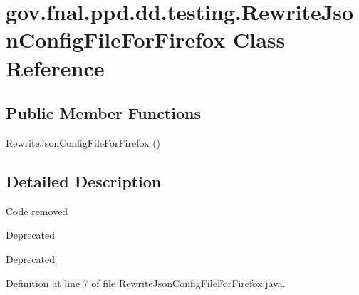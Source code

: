 \hypertarget{classgov_1_1fnal_1_1ppd_1_1dd_1_1testing_1_1RewriteJsonConfigFileForFirefox}{\section{gov.\-fnal.\-ppd.\-dd.\-testing.\-Rewrite\-Json\-Config\-File\-For\-Firefox Class Reference}
\label{classgov_1_1fnal_1_1ppd_1_1dd_1_1testing_1_1RewriteJsonConfigFileForFirefox}
}
\subsection*{Public Member Functions}
\begin{DoxyCompactItemize}
\item 
\hyperlink{classgov_1_1fnal_1_1ppd_1_1dd_1_1testing_1_1RewriteJsonConfigFileForFirefox_aeb65d348ecd52c3ae2d3b50cb0b6d6d7}{Rewrite\-Json\-Config\-File\-For\-Firefox} ()
\end{DoxyCompactItemize}


\subsection{Detailed Description}
Code removed \begin{DoxyRefDesc}{Deprecated}
\item[\hyperlink{deprecated__deprecated000009}{Deprecated}]\end{DoxyRefDesc}


Definition at line 7 of file Rewrite\-Json\-Config\-File\-For\-Firefox.\-java.



